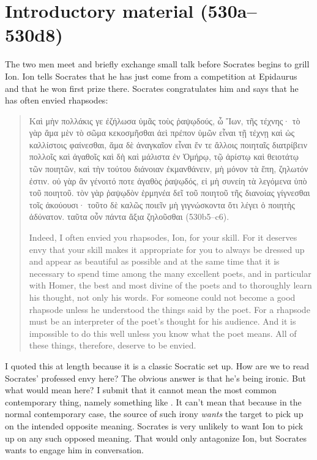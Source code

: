 \documentclass[11pt]{article}
\begin{document}


\section{Introductory material (530a--530d8)}

The two men meet and briefly exchange small talk before Socrates begins to
grill Ion.  Ion tells Socrates that he has just come from a competition at
Epidaurus and that he won first prize there.  Socrates congratulates him
and says that he has often envied rhapsodes:

\begin{quote}
    {\g
    Καὶ μὴν πολλάκις γε ἐζήλωσα ὑμᾶς τοὺς ῥαψῳδούς, ὦ Ἴων, τῆς τέχνης· τὸ
    γὰρ ἅμα μὲν τὸ σῶμα κεκοσμῆσθαι ἀεὶ πρέπον ὑμῶν εἶναι τῇ τέχνῃ καὶ ὡς
    καλλίστοις φαίνεσθαι, ἅμα δὲ ἀναγκαῖον εἶναι ἔν τε ἄλλοις ποιηταῖς
    διατρίβειν πολλοῖς καὶ ἀγαθοῖς καὶ δὴ καὶ μάλιστα ἐν Ὁμήρῳ, τῷ ἀρίστῳ
    καὶ θειοτάτῳ τῶν ποιητῶν, καὶ τὴν τούτου διάνοιαν ἐκμανθάνειν, μὴ μόνον
    τὰ ἔπη, ζηλωτόν ἐστιν. οὐ γὰρ ἂν γένοιτό ποτε ἀγαθὸς ῥαψῳδός, εἰ μὴ
    συνείη τὰ λεγόμενα ὑπὸ τοῦ ποιητοῦ. τὸν γὰρ ῥαψῳδὸν ἑρμηνέα δεῖ τοῦ
    ποιητοῦ τῆς διανοίας γίγνεσθαι τοῖς ἀκούουσι· τοῦτο δὲ καλῶς ποιεῖν μὴ
    γιγνώσκοντα ὅτι λέγει ὁ ποιητὴς ἀδύνατον. ταῦτα οὖν πάντα ἄξια
    ζηλοῦσθαι
    } (530b5--c6).

    Indeed, I often envied you rhapsodes, Ion, for your skill. For it
    deserves envy that your skill makes it appropriate for you to always be
    dressed up and appear as beautiful as possible and at the same time
    that it is necessary to spend time among the many excellent poets, and
    in particular with Homer, the best and most divine of the poets and to
    thoroughly learn his thought, not only his words. For someone could not
    become a good rhapsode unless he understood the things said by the
    poet. For a rhapsode must be an interpreter of the poet's thought for
    his audience. And it is impossible to do this well unless you know what
    the poet means. All of these things, therefore, deserve to be envied.
\end{quote}

I quoted this at length because it is a classic Socratic set up.  How are
we to read Socrates' professed envy here?  The obvious answer is that he's
being ironic.  But what would  mean here?  I submit that it
cannot mean the most common contemporary thing, namely something like
.  It
can't mean that because in the normal contemporary case, the source of such
irony \emph{wants} the target to pick up on the intended opposite meaning.
Socrates is very unlikely to want Ion to pick up on any such opposed
meaning.  That would only antagonize Ion, but Socrates wants to engage him
in conversation.
\end{document}
